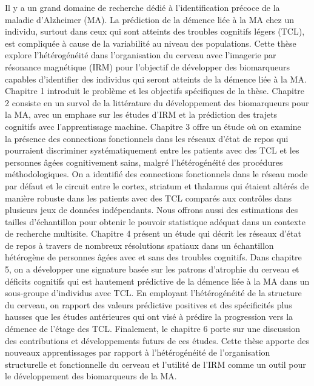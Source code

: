 \documentclass[
12pt, %
oneside, %
english, %
onehalfspacing, %
liststotoc, %
toctotoc, %
headsepline, %
consistentlayout, %
]{MastersDoctoralThesis} %
\begin{document}
\begin{resume}
\addchaptertocentry{\resumename} %
Il y a un grand domaine de recherche dédié à l’identification précoce de la maladie d’Alzheimer (MA). La prédiction de la démence liée à la MA chez un individu, surtout dans ceux qui sont atteints des troubles cognitifs légers (TCL), est compliquée à cause de la variabilité au niveau des populations. Cette thèse explore l’hétérogénéité dans l’organisation du cerveau avec l’imagerie par résonance magnétique (IRM) pour l’objectif de développer des biomarqueurs capables d’identifier des individus qui seront atteints de la démence liée à la MA. Chapitre 1 introduit le problème et les objectifs spécifiques de la thèse. Chapitre 2 consiste en un survol de la littérature du développement des biomarqueurs pour la MA, avec un emphase sur les études d'IRM et la prédiction des trajets cognitifs avec l’apprentissage machine. Chapitre 3 offre un étude où on examine la présence des connections fonctionnels dans les réseaux d’état de repos qui pourraient discriminer systématiquement entre les patients avec des TCL et les personnes âgées cognitivement sains, malgré l’hétérogénéité des procédures méthodologiques. On a identifié des connections fonctionnels dans le réseau mode par défaut et le circuit entre le cortex, striatum et thalamus qui étaient altérés de manière robuste dans les patients avec des TCL comparés aux contrôles dans plusieurs jeux de données indépendants. Nous offrons aussi des estimations des tailles d’échantillon pour obtenir le pouvoir statistique adéquat dans un contexte de recherche multisite. Chapitre 4 présent un étude qui décrit les réseaux d’état de repos à travers de nombreux résolutions spatiaux dans un échantillon hétérogène de personnes âgées avec et sans des troubles cognitifs. Dans chapitre 5, on a développer une signature basée sur les patrons d’atrophie du cerveau et déficits cognitifs qui est hautement prédictive de la démence liée à la MA dans un sous-groupe d’individus avec TCL. En employant l’hétérogénéité de la structure du cerveau, on rapport des valeurs prédictive positives et des spécificités plus hausses que les études antérieures qui ont visé à prédire la progression vers la démence de l’étage des TCL. Finalement, le chapitre 6 porte sur une discussion des contributions et développements futurs de ces études. Cette thèse apporte des nouveaux apprentissages par rapport à l’hétérogénéité de l’organisation structurelle et fonctionnelle du cerveau et l’utilité de l’IRM comme un outil pour le développement des biomarqueurs de la MA.
\end{resume}
\end{document}
